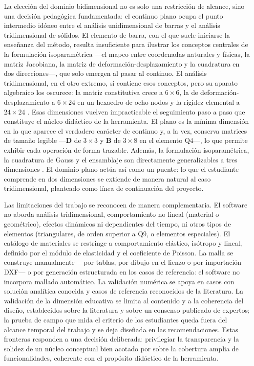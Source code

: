 La elección del dominio bidimensional no es solo una restricción de alcance, sino una decisión pedagógica fundamentada: el continuo plano ocupa el punto intermedio idóneo entre el análisis unidimensional de barras y el análisis tridimensional de sólidos. El elemento de barra, con el que suele iniciarse la enseñanza del método, resulta insuficiente para ilustrar los conceptos centrales de la formulación isoparamétrica —el mapeo entre coordenadas naturales y físicas, la matriz Jacobiana, la matriz de deformación-desplazamiento y la cuadratura en dos direcciones—, que solo emergen al pasar al continuo. El análisis tridimensional, en el otro extremo, sí contiene esos conceptos, pero su aparato algebraico los oscurece: la matriz constitutiva crece a $6\times6$, la de deformación-desplazamiento a $6\times24$ en un hexaedro de ocho nodos y la rigidez elemental a $24\times24$ \autocite[p.~218]{cook2002concepts}. Esas dimensiones vuelven impracticable el seguimiento paso a paso que constituye el núcleo didáctico de la herramienta. El plano es la mínima dimensión en la que aparece el verdadero carácter de continuo y, a la vez, conserva matrices de tamaño legible —$\bm{D}$ de $3\times3$ y $\bm{B}$ de $3\times8$ en el elemento Q4—, lo que permite exhibir cada operación de forma trazable. Además, la formulación isoparamétrica, la cuadratura de Gauss y el ensamblaje son directamente generalizables a tres dimensiones \autocite{bathe2014fem,zienkiewicz2013fem}. El dominio plano actúa así como un puente: lo que el estudiante comprende en dos dimensiones se extiende de manera natural al caso tridimensional, planteado como línea de continuación del proyecto.

Las limitaciones del trabajo se reconocen de manera complementaria. El software no aborda análisis tridimensional, comportamiento no lineal (material o geométrico), efectos dinámicos ni dependientes del tiempo, ni otros tipos de elementos (triangulares, de orden superior a Q9, o elementos especiales). El catálogo de materiales se restringe a comportamiento elástico, isótropo y lineal, definido por el módulo de elasticidad y el coeficiente de Poisson. La malla se construye manualmente —por tablas, por dibujo en el lienzo o por importación DXF— o por generación estructurada en los casos de referencia: el software no incorpora mallado automático. La validación numérica se apoya en casos con solución analítica conocida y casos de referencia reconocidos de la literatura. La validación de la dimensión educativa se limita al contenido y a la coherencia del diseño, establecidos sobre la literatura y sobre un consenso publicado de expertos; la prueba de campo que mida el criterio de los estudiantes queda fuera del alcance temporal del trabajo y se deja diseñada en las recomendaciones. Estas fronteras responden a una decisión deliberada: privilegiar la transparencia y la solidez de un núcleo conceptual bien acotado por sobre la cobertura amplia de funcionalidades, coherente con el propósito didáctico de la herramienta.

